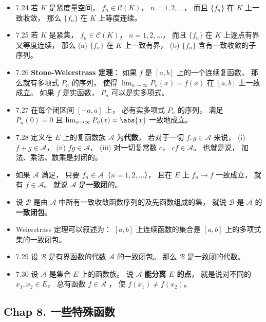 \begin{itemize}
\item 7.24 若 $K$ 是紧度量空间， $f_n\in \mathscr C(K)$， $n=1,2,\dots$， 而且 $\{f_n\}$ 在 $K$ 上一致收敛， 那么 $\{f_n\}$ 在 $K$ 上等度连续。

\item 7.25 若 $K$ 是紧集， $f_n\in \mathscr C(K)$， $n=1,2,\dots$， 而且 $\{f_n\}$ 在 $K$ 上逐点有界又等度连续， 那么 (a) $\{f_n\}$ 在 $K$ 上一致有界， (b) $\{f_n\}$ 含有一致收敛的子序列。

\item 7.26 \textbf{Stone-Weierstrass 定理}： 如果 $f$ 是 $[a,b]$ 上的一个连续复函数， 那么就有多项式 $P_n$ 的序列， 使得 $\lim_{n\to\infty} P_n(x) = f(x)$ 在 $[a,b]$ 上一致成立。 如果 $f$ 是实函数， $P_n$ 可以是实多项式。

\item 7.27 在每个闭区间 $[-a,a]$ 上， 必有实多项式 $P_n$ 的序列， 满足 $P_n(0) = 0$ 且 $\lim_{n\to\infty} P_n(x) = \abs{x}$ 一致地成立。

\item 7.28 定义在 $E$ 上的复函数族 $\mathscr A$ 为\textbf{代数}， 若对于一切 $f,g\in \mathscr A$ 来说， (i) $f+g\in \mathscr A$， (ii) $fg\in \mathscr A$， (iii) 对一切复常数 $c$， $cf\in \mathscr A$。 也就是说， 加法、乘法、数乘是封闭的。

\item 如果 $\mathscr A$ 满足， 只要 $f_n\in \mathscr A$（$n=1,2,\dots$）， 且在 $E$ 上 $f_n\to f$ 一致成立， 就有 $f\in \mathscr A$。 就说 $\mathscr A$ 是\textbf{一致闭}的。

\item 设 $\mathscr B$ 是由 $\mathscr A$ 中所有一致收敛函数序列的及先函数组成的集， 就说 $\mathscr B$ 是 $\mathscr A$ 的\textbf{一致闭包}。

\item Weierstrass 定理可以叙述为： $[a,b]$ 上连续函数的集合是 $[a,b]$ 上的多项式集的一致闭包。

\item 7.29 设 $\mathscr B$ 是有界函数的代数 $\mathscr A$ 的一致闭包。 那么 $\mathscr B$ 是一致闭的代数。

\item 7.30 设 $\mathscr A$ 是集合 $E$ 上的函数族。 说 $\mathscr A$ \textbf{能分离 $E$ 的点}， 就是说对不同的 $x_1,x_2\in E$， 总有函数 $f\in \mathscr A$ ， 使 $f(x_1)\ne f(x_2)$。
\end{itemize}


\subsection{Chap 8. 一些特殊函数}


